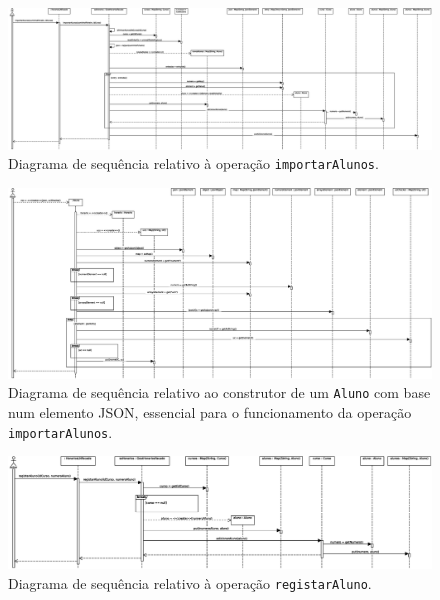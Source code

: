 \documentclass[12pt, a4paper]{article}
\begin{document}
\begin{landscape}
        \vspace*{\fill}
        \pagebreak
        \vspace*{\fill}

        \begin{figure}[H]
            \centering
            \includegraphics[scale=0.40]{Imagens/Modelos/importarAlunos.svg.eps}
            \caption{
                Diagrama de sequência relativo à operação \texttt{importarAlunos}.
            }
        \end{figure}

        \vspace*{\fill}
        \pagebreak
        \vspace*{\fill}

        \begin{figure}[H]
            \centering
            \includegraphics[scale=0.45]{Imagens/Modelos/importarAlunosConstrutor.svg.eps}
            \caption{
                Diagrama de sequência relativo ao construtor de um \texttt{Aluno} com base num
                elemento JSON, essencial para o funcionamento da operação \texttt{importarAlunos}.
            }
        \end{figure}

        \vspace*{\fill}
        \pagebreak
        \vspace*{\fill}

        \begin{figure}[H]
            \centering
            \includegraphics[scale=0.60]{Imagens/Modelos/registarAluno.svg.eps}
            \caption{
                Diagrama de sequência relativo à operação \texttt{registarAluno}.
            }
        \end{figure}


\end{landscape}
\end{document}
